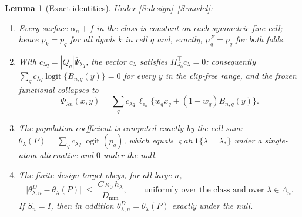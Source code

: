 \documentclass[11pt]{article}
\newtheorem{lemma}[theorem]{Lemma}
\theoremstyle{definition}
\newcommand{\1}{\mathbf 1}\newcommand{\op}{\operatorname}
\begin{document}
\begin{lemma}[Exact identities]\label{lem:U-exact}
Under \ref{S:design}--\ref{S:model}:
\begin{enumerate}[label=\textup{(\alph*)},leftmargin=2em,itemsep=2pt]
\item Every surface $\alpha_n+f$ in the class is constant on each symmetric fine
cell; hence $p_k=p_q$ for all dyads $k$ in cell $q$ and, exactly,
$\mu_q^F=p_q$ for both folds.
\item With $c_{\lambda q}=|Q_q|\overline\Psi_{\lambda q}$, the vector
$c_\lambda$ satisfies $\Pi_{J_0}^\top c_\lambda=0$; consequently
$\sum_qc_{\lambda q}\operatorname{logit}\{B_{n,q}(y)\}=0$ for every $y$ in the
clip-free range, and the frozen functional collapses to
\[
\Phi_{\lambda n}(x,y)
=\sum_{q}c_{\lambda q}\,
\ell_{\epsilon_n}\{w_qx_q+(1-w_q)B_{n,q}(y)\}.
\]
\item The population coefficient is computed exactly by the cell sum:
$\theta_\lambda(P)=\sum_qc_{\lambda q}\operatorname{logit}(p_q)$, which equals
$\varsigma ah\,\mathbf 1\{\lambda=\lambda_*\}$ under a single-atom alternative
and $0$ under the null.
\item The finite-design target obeys, for all large $n$,
\[
\bigl|\theta_{\lambda,n}^{D}-\theta_\lambda(P)\bigr|
\;\le\;
\frac{C\,\kappa_0\,h_\lambda}{D_{\min}},
\qquad\text{uniformly over the class and over }\lambda\in\Lambda_n .
\]
If $S_n=I$, then in addition $\theta_{\lambda,n}^{D}=\theta_\lambda(P)$ exactly
under the null.
\end{enumerate}
\end{lemma}
\end{document}
